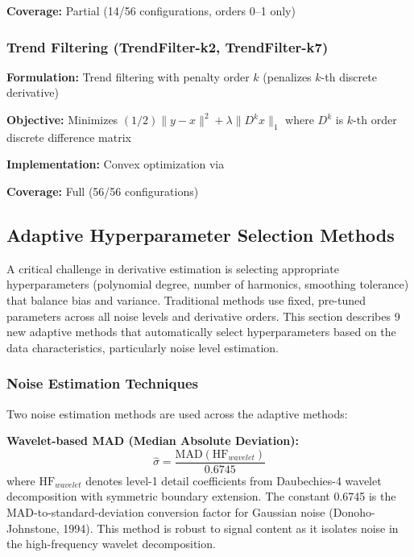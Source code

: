 \textbf{Coverage:} Partial (14/56 configurations, orders 0--1 only)

\subsubsection{Trend Filtering (TrendFilter-k2, TrendFilter-k7)}

\textbf{Formulation:} Trend filtering with penalty order $k$ (penalizes $k$-th discrete derivative)

\textbf{Objective:} Minimizes $(1/2)\|y - x\|^2 + \lambda \|D^k x\|_1$ where $D^k$ is $k$-th order discrete difference matrix

\textbf{Implementation:} Convex optimization via 

\textbf{Coverage:} Full (56/56 configurations)

\subsection{Adaptive Hyperparameter Selection Methods}
\label{sec:adaptive_methods}

A critical challenge in derivative estimation is selecting appropriate hyperparameters (polynomial degree, number of harmonics, smoothing tolerance) that balance bias and variance. Traditional methods use fixed, pre-tuned parameters across all noise levels and derivative orders. This section describes 9 new adaptive methods that automatically select hyperparameters based on the data characteristics, particularly noise level estimation.

\subsubsection{Noise Estimation Techniques}

Two noise estimation methods are used across the adaptive methods:

\textbf{Wavelet-based MAD (Median Absolute Deviation):}
\begin{equation}
\hat{\sigma} = \frac{\text{MAD}(\text{HF}_{wavelet})}{0.6745}
\end{equation}
where $\text{HF}_{wavelet}$ denotes level-1 detail coefficients from Daubechies-4 wavelet decomposition with symmetric boundary extension. The constant 0.6745 is the MAD-to-standard-deviation conversion factor for Gaussian noise (Donoho-Johnstone, 1994). This method is robust to signal content as it isolates noise in the high-frequency wavelet decomposition.

